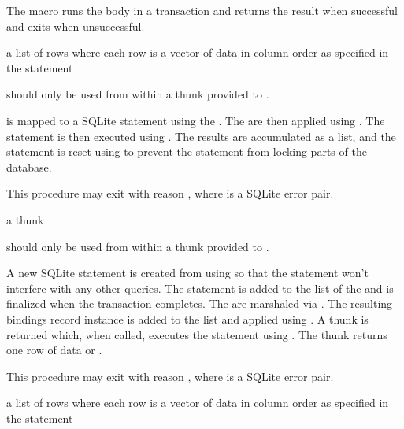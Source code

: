 The  macro runs the body in a transaction and
returns the result when successful and exits when unsuccessful.

\begin{procedure}
\end{procedure}
\returns{}
a list of rows where each row is a vector of data in column order as
specified in the  statement

 should only be used from within a thunk 
provided to .

 is mapped to a SQLite statement using the
. The  are then applied using
. The statement is then executed using
. The results are accumulated as a list, and the
statement is reset using  to prevent the
statement from locking parts of the database.

This procedure may exit with reason , where  is a SQLite error pair.

\begin{procedure}
\end{procedure}
\returns{}
a thunk

 should only be used from within a thunk 
provided to .

A new SQLite statement is created from  using
 so that the statement won't interfere with
any other queries. The statement is added to the
 list of the  and is
finalized when the transaction completes.  The  are marshaled
via . The resulting bindings record instance
is added to the  list and applied
using . A thunk is returned which, when
called, executes the statement using . The thunk
returns one row of data or .

This procedure may exit with reason , where  is a SQLite error pair.

\begin{procedure}
\end{procedure}
\returns{}
a list of rows where each row is a vector of data in column order as
specified in the  statement

